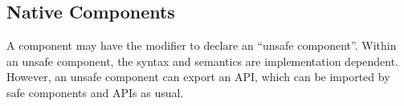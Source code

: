 \subsection{Native Components}
A component may have the modifier  to declare an
``unsafe component''.  Within an unsafe component,
the syntax and semantics are implementation dependent.
However, an unsafe component can export an API,
which can be imported by safe components and APIs as usual.


